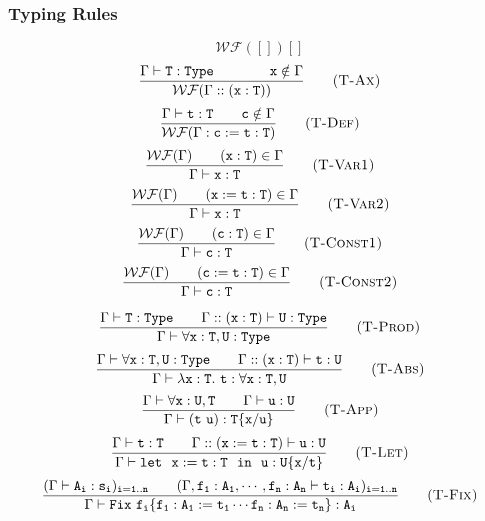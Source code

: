 \subsubsection{Typing Rules}
\begin{equation*}
\mathcal{WF}([])[] 
    \tag{\sc T-Empty}
\end{equation*}
\begin{equation*}
\frac{\Gamma\vdash {\tt T:Type\qquad \qquad x}\notin\Gamma}
    {\mathcal{WF}(\Gamma ::(\tt x:T))} 
    \tag{\sc T-Ax}
\end{equation*}
\begin{equation*}
\frac{\Gamma\vdash {\tt t:T\qquad c}\notin \Gamma}
    {\mathcal{WF}(\Gamma:\tt c:=t:T)} 
    \tag{\sc T-Def}
\end{equation*}
\begin{equation*}
\frac{\mathcal{WF}(\Gamma)\qquad ({\tt x:T})\in\Gamma}
    {\Gamma\vdash\tt x:T} 
    \tag{\sc T-Var1}
\end{equation*}
\begin{equation*}
\frac{\mathcal{WF}(\Gamma)\qquad ({\tt x:=t:T})\in\Gamma}
    {\Gamma\vdash\tt x:T} 
    \tag{\sc T-Var2}
\end{equation*}
\begin{equation*}
\frac{\mathcal{WF}(\Gamma)\qquad ({\tt c:T})\in \Gamma}
    {\Gamma\vdash\tt c:T} 
    \tag{\sc T-Const1}
\end{equation*}
\begin{equation*}
\frac{\mathcal{WF}(\Gamma)\qquad ({\tt c:=t:T})\in \Gamma}
    {\Gamma\vdash\tt c:T} 
    \tag{\sc T-Const2}
\end{equation*}

\begin{equation*}
\frac{\Gamma\vdash{\tt T:Type}\qquad \Gamma::({\tt x:T})\vdash\tt U:Type}
    {\Gamma\vdash\tt\forall x:T,U:Type} 
    \tag{\sc T-Prod}
\end{equation*}
\begin{equation*}
\frac{\Gamma\vdash\forall{\tt x:T,U:Type}\qquad \Gamma::({\tt x:T})\vdash{\tt t:U}}
    {\Gamma\vdash\lambda{\tt x:T.\ t:\forall x:T,U}} 
    \tag{\sc T-Abs}
\end{equation*}
\begin{equation*}
\frac{\Gamma\vdash\forall{\tt x:U,T}\qquad \Gamma\vdash{\tt u:U}}
    {\Gamma\vdash{\tt (t\ u):T\{x/u\}}} 
    \tag{\sc T-App}
\end{equation*}
\begin{equation*}
\frac{\Gamma\vdash{\tt t:T}\qquad \Gamma::({\tt x:=t:T})\vdash{\tt u:U}}
    {\Gamma\vdash{\tt let\ \ x:=t:T\ \ in\ \ u:U\{x/t\}}} 
    \tag{\sc T-Let}
\end{equation*}
\begin{equation*}
\frac{(\Gamma\vdash {\tt A_i:s_i)_{i=1..n}}\qquad (\Gamma,\tt f_1:A_1,\cdots,f_n:A_n\vdash t_i:A_i)_{i=1..n}}
    {\Gamma\vdash\tt Fix\ f_i\{f_1:A_1:=t_1\cdots f_n:A_n:=t_n\}:A_i}
    \tag{\sc T-Fix}
\end{equation*}

